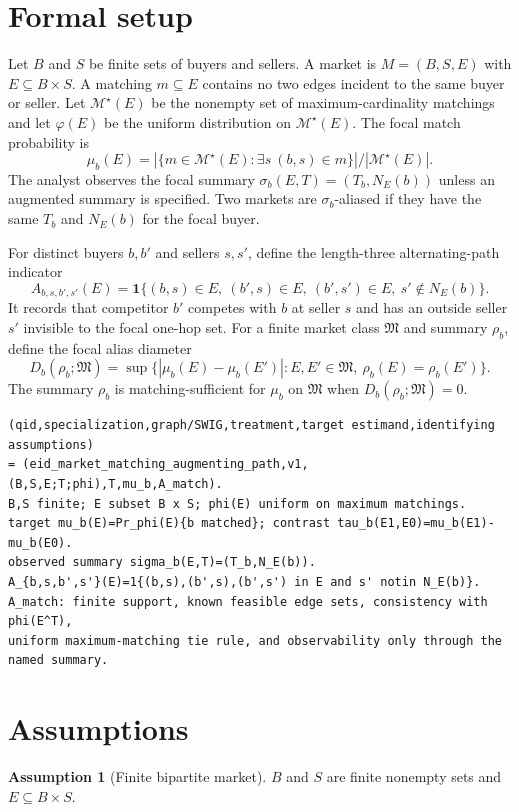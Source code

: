 \documentclass[11pt]{article}
\newcommand{\one}{\mathbf{1}}
\theoremstyle{definition}
\newtheorem{assumption}{Assumption}
\theoremstyle{plain}
\theoremstyle{remark}
\begin{document}
\section{Formal setup}
Let $B$ and $S$ be finite sets of buyers and sellers. A market is $M=(B,S,E)$ with $E\subseteq B\times S$. A matching $m\subseteq E$ contains no two edges incident to the same buyer or seller. Let $\mathcal M^\star(E)$ be the nonempty set of maximum-cardinality matchings and let $\varphi(E)$ be the uniform distribution on $\mathcal M^\star(E)$. The focal match probability is
\[
  \mu_b(E)=|\{m\in\mathcal M^\star(E):\exists s\ (b,s)\in m\}|/|\mathcal M^\star(E)|.
\]
The analyst observes the focal summary $\sigma_b(E,T)=(T_b,N_E(b))$ unless an augmented summary is specified. Two markets are $\sigma_b$-aliased if they have the same $T_b$ and $N_E(b)$ for the focal buyer.

For distinct buyers $b,b'$ and sellers $s,s'$, define the length-three alternating-path indicator
\[
  A_{b,s,b',s'}(E)=\one\{(b,s)\in E,\ (b',s)\in E,\ (b',s')\in E,\ s'\notin N_E(b)\}.
\]
It records that competitor $b'$ competes with $b$ at seller $s$ and has an outside seller $s'$ invisible to the focal one-hop set. For a finite market class $\mathfrak M$ and summary $\rho_b$, define the focal alias diameter
\[
  D_b(\rho_b;\mathfrak M)=
  \sup\{|\mu_b(E)-\mu_b(E')|: E,E'\in\mathfrak M,\ \rho_b(E)=\rho_b(E')\}.
\]
The summary $\rho_b$ is matching-sufficient for $\mu_b$ on $\mathfrak M$ when $D_b(\rho_b;\mathfrak M)=0$.

\begin{verbatim}
(qid,specialization,graph/SWIG,treatment,target estimand,identifying assumptions)
= (eid_market_matching_augmenting_path,v1,(B,S,E;T;phi),T,mu_b,A_match).
B,S finite; E subset B x S; phi(E) uniform on maximum matchings.
target mu_b(E)=Pr_phi(E){b matched}; contrast tau_b(E1,E0)=mu_b(E1)-mu_b(E0).
observed summary sigma_b(E,T)=(T_b,N_E(b)).
A_{b,s,b',s'}(E)=1{(b,s),(b',s),(b',s') in E and s' notin N_E(b)}.
A_match: finite support, known feasible edge sets, consistency with phi(E^T),
uniform maximum-matching tie rule, and observability only through the named summary.
\end{verbatim}

\section{Assumptions}
\begin{assumption}[Finite bipartite market]\label{ass:finite-market}
$B$ and $S$ are finite nonempty sets and $E\subseteq B\times S$.
\end{assumption}
\end{document}
